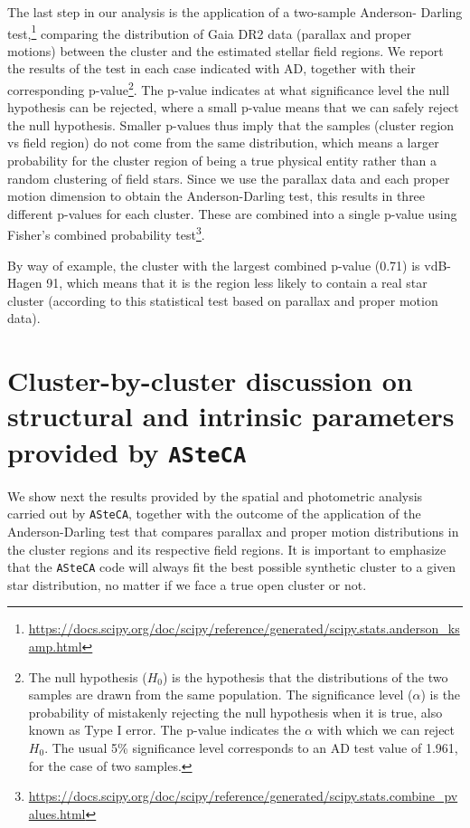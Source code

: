\documentclass{aa}
\begin{document}
The last step in our analysis is the application of a two-sample Anderson-
Darling
test,\footnote{\url{https://docs.scipy.org/doc/scipy/reference/generated/scipy.stats.anderson_ksamp.html}}
comparing the distribution of Gaia DR2 data (parallax and proper motions)
between the cluster and the estimated stellar field regions.
We report the results of the test in each case indicated with AD, together with
their corresponding p-value\footnote{The null hypothesis ($H_{0}$) is the hypothesis
that the distributions of the two samples are drawn from the same population.
The significance level ($\alpha$) is the probability of mistakenly rejecting the
null hypothesis when it is true, also known as Type I error. The p-value
indicates the $\alpha$ with which we can reject $H_{0}$. The usual 5\%
significance level corresponds to an AD test value of 1.961, for the case of two
samples.}.
The p-value indicates at what significance level the null hypothesis
can be rejected, where a small p-value means that we can safely reject the
null hypothesis. Smaller p-values thus imply that the samples (cluster region vs
field region) do not come from the same distribution, which means a larger
probability for the cluster region of being a true physical entity rather than a
random clustering of field stars.
Since we use the parallax data and each proper motion dimension to obtain the
Anderson-Darling test, this results in three different p-values for each
cluster. These are combined into a single p-value using Fisher's combined
probability test\footnote{\url{https://docs.scipy.org/doc/scipy/reference/generated/scipy.stats.combine_pvalues.html}}.

By way of example, the cluster with the largest combined p-value (0.71) is
vdB-Hagen 91, which means that it is the region less likely to contain a real
star cluster (according to this statistical test based on parallax and proper
motion data).






\section{Cluster-by-cluster discussion on structural and intrinsic parameters
provided by \texttt{ASteCA}}
\label{sec:cluster_discuss}

We show next the results provided by the spatial and photometric analysis
carried out by \texttt{ASteCA}, together with the outcome of the application of
the Anderson-Darling test that compares parallax and proper motion distributions
in the cluster regions and its respective field regions.
It is important to emphasize that the \texttt{ASteCA} code will always fit the
best possible synthetic cluster to a given star distribution, no matter if we
face a true open cluster or not.
\end{document}

